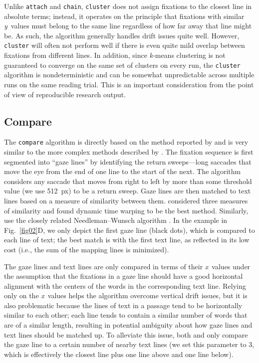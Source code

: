 \documentclass[doc,biblatex]{apa7}
\begin{document}
Unlike \texttt{attach} and \texttt{chain}, \texttt{cluster} does not assign fixations to the closest line in absolute terms; instead, it operates on the principle that fixations with similar \textit{y}~values must belong to the same line regardless of how far away that line might be. As such, the algorithm generally handles drift issues quite well. However, \texttt{cluster} will often not perform well if there is even quite mild overlap between fixations from different lines. In addition, since \textit{k}-means clustering is not guaranteed to converge on the same set of clusters on every run, the \texttt{cluster} algorithm is nondeterministic and can be somewhat unpredictable across multiple runs on the same reading trial. This is an important consideration from the point of view of reproducible research output.

\subsection{Compare}

The \texttt{compare} algorithm is directly based on the method reported by \textcite{LimaSanches:2015} and is very similar to the more complex methods described by \textcite{Yamaya:2017}. The fixation sequence is first segmented into ``gaze lines'' by identifying the return sweeps---long saccades that move the eye from the end of one line to the start of the next. The algorithm considers any saccade that moves from right to left by more than some threshold value (we use 512~px) to be a return sweep. Gaze lines are then matched to text lines based on a measure of similarity between them. \textcite{LimaSanches:2015} considered three measures of similarity and found dynamic time warping \parencite{Vintsyuk:1968,Sakoe:1978} to be the best method. Similarly, \textcite{Yamaya:2017} use the closely related Needleman--Wunsch algorithm \parencite{Needleman:1970}. In the example in Fig.~\ref{fig02}D, we only depict the first gaze line (black dots), which is compared to each line of text; the best match is with the first text line, as reflected in its low cost (i.e., the sum of the mapping lines is minimized).

The gaze lines and text lines are only compared in terms of their \textit{x}~values under the assumption that the fixations in a gaze line should have a good horizontal alignment with the centers of the words in the corresponding text line. Relying only on the \textit{x}~values helps the algorithm overcome vertical drift issues, but it is also problematic because the lines of text in a passage tend to be horizontally similar to each other; each line tends to contain a similar number of words that are of a similar length, resulting in potential ambiguity about how gaze lines and text lines should be matched up. To alleviate this issue, both \textcite{LimaSanches:2015} and \textcite{Yamaya:2017} only compare the gaze line to a certain number of nearby text lines (we set this parameter to 3, which is effectively the closest line plus one line above and one line below).
\end{document}
